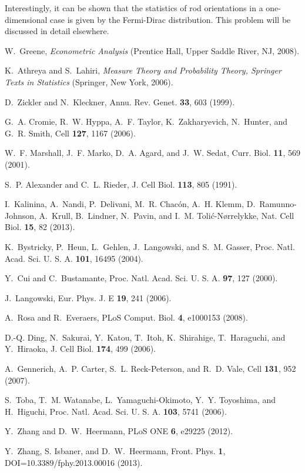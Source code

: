 \documentclass[aps,showpacs,twocolumn,floatfix,prx,superscriptaddress]{revtex4-1}
\begin{document}
\begin{thebibliography}{10}
Interestingly, it can be shown that the statistics of rod orientations in a one-dimensional case is given by the Fermi-Dirac distribution. This problem will be discussed in detail elsewhere.

W.~Greene,
  \emph{Econometric Analysis}
  (Prentice Hall, Upper Saddle River, NJ, 2008).

K.~Athreya and
  S.~Lahiri,
  \emph{Measure Theory and Probability Theory, Springer Texts
  in Statistics }(Springer, New York, 2006).

D.~Zickler and
  N.~Kleckner,
  Annu. Rev. Genet. \textbf{33},
  603 (1999).

G.~A. Cromie,
  R.~W. Hyppa,
  A.~F. Taylor,
  K.~Zakharyevich,
  N.~Hunter, and
  G.~R. Smith,
  Cell \textbf{127}, 1167
  (2006).

W.~F. Marshall,
  J.~F. Marko,
  D.~A. Agard, and
  J.~W. Sedat,
  Curr. Biol. \textbf{11},
  569 (2001).

S.~P. Alexander
  and C.~L.
  Rieder, J. Cell Biol.
  \textbf{113}, 805 (1991).

I.~Kalinina,
  A.~Nandi,
  P.~Delivani,
  M.~R. Chac\'on,
  A.~H. Klemm,
  D.~Ramunno-Johnson,
  A.~Krull,
  B.~Lindner,
  N.~Pavin, and
  I.~M. Toli\'c-N{\o}rrelykke,
  Nat. Cell Biol. \textbf{15},
  82 (2013).

K.~Bystricky,
  P.~Heun,
  L.~Gehlen,
  J.~Langowski,
  and S.~M.
  Gasser, Proc. Natl. Acad. Sci. U. S. A.
  \textbf{101}, 16495
  (2004).

Y.~Cui and
  C.~Bustamante,
  Proc. Natl. Acad. Sci. U. S. A.
  \textbf{97}, 127 (2000).

J.~Langowski,
  Eur. Phys. J. E \textbf{19}, 241
  (2006).

A.~Rosa and
  R.~Everaers,
  PLoS Comput. Biol. \textbf{4},
  e1000153 (2008).

D.-Q. Ding,
  N.~Sakurai,
  Y.~Katou,
  T.~Itoh,
  K.~Shirahige,
  T.~Haraguchi,
  and Y.~Hiraoka,
  J. Cell Biol.
  \textbf{174}, 499 (2006).

A.~Gennerich,
  A.~P. Carter,
  S.~L. Reck-Peterson,
  and R.~D. Vale,
  Cell \textbf{131}, 952
  (2007).

S.~Toba,
  T.~M. Watanabe,
  L.~Yamaguchi-Okimoto,
  Y.~Y. Toyoshima,
  and H.~Higuchi,
  Proc. Natl. Acad. Sci. U. S. A.
  \textbf{103}, 5741 (2006).
  
 Y.~Zhang and D.~W.~Heermann, PLoS ONE \textbf{6}, e29225 (2012).
 
Y.~Zhang, S. Isbaner, and D.~W.~Heermann, Front. Phys. \textbf{1}, DOI=10.3389/fphy.2013.00016 (2013).
\end{thebibliography}

\end{document}
